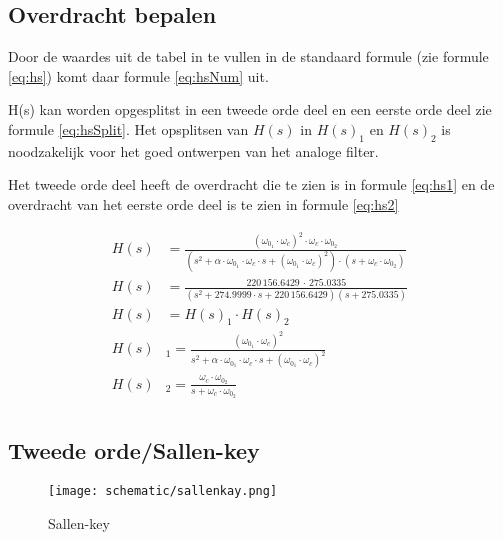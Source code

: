 \subsection{Overdracht bepalen}
\begin{minipage}{0.40\textwidth}
	Door de waardes uit de tabel in te vullen in de standaard formule (zie formule \ref{eq:hs})
	komt daar formule \ref{eq:hsNum} uit.

	\noindent
	H(s) kan worden opgesplitst in een tweede orde deel en een eerste orde deel zie formule \ref{eq:hsSplit}.
	Het opsplitsen van $H(s)$ in $H(s)_1$ en $H(s)_2$ is noodzakelijk voor het goed ontwerpen van het analoge 
	filter.

	\noindent
	Het tweede orde deel heeft de overdracht die te zien is in formule \ref{eq:hs1} en de overdracht van
	het eerste orde	deel is te zien in formule \ref{eq:hs2}
\end{minipage}
\hfill
\begin{minipage}{0.60\textwidth}
	\begin{align}
		H(s)&=\frac{(\omega_{0_1}\cdot\omega_c)^2\cdot\omega_c\cdot\omega_{0_2}}{(s^2+ \alpha \cdot \omega_{0_1} \cdot \omega_c \cdot s + (\omega_{0_1}\cdot\omega_c)^2)\cdot (s + \omega_c \cdot \omega_{0_2})} \label{eq:hs} \\
		H(s)&=\frac{220\, 156.6429\,\cdot\, 275.0335}{(s^2+274.9999\cdot s+220\, 156.6429)(s+275.0335)} \label{eq:hsNum}\\
		H(s)&= H(s)_1 \cdot H(s)_2 \label{eq:hsSplit} \\ 
		H(s)&_1=\frac{(\omega_{0_1}\cdot\omega_c)^2}{s^2+ \alpha \cdot \omega_{0_1} \cdot \omega_c \cdot s + (\omega_{0_1}\cdot\omega_c)^2} \label{eq:hs1} \\ 
		H(s)&_2=\frac{\omega_c\cdot\omega_{0_2}}{s + \omega_c \cdot \omega_{0_2}} \label{eq:hs2} \\ 
	\end{align}
\end{minipage}
 

\subsection{Tweede orde/Sallen-key}
\begin{wrapfigure}{l}{0.25 \textwidth}
	\texttt{[image: schematic/sallenkay.png]}
	\caption{Sallen-key}
	\label{fig:sallenKey}
\end{wrapfigure}

